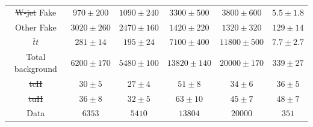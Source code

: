 \documentclass[PAPER, coverpage, atlasdraft=true, texlive=2016, UKenglish]{\ATLASLATEXPATH atlasdoc}
\providecommand{\DIFadd}[1]{{\protect\color{blue}\uwave{#1}}} %
\providecommand{\DIFdel}[1]{{\protect\color{red}\sout{#1}}}                      %
\providecommand{\DIFaddFL}[1]{\DIFadd{#1}} %
\providecommand{\DIFdelFL}[1]{\DIFdel{#1}} %
\providecommand{\DIFaddbeginFL}{} %
\providecommand{\DIFaddendFL}{} %
\providecommand{\DIFdelbeginFL}{} %
\providecommand{\DIFdelendFL}{} %
\begin{document}
\begin{table}[htbp]
\begin{tabular}{cccccc}
  \DIFdelbeginFL \DIFdelFL{W-jet }\DIFdelendFL \DIFaddbeginFL \DIFaddFL{$W$-jet }\DIFaddendFL Fake             & \DIFaddbeginFL \DIFaddFL{~~}\DIFaddendFL $970 \pm 200 $  & $1090 \pm 240$  & $3300 \pm 500$  &  $3800 \pm 600$  & \DIFaddbeginFL \DIFaddFL{~~}\DIFaddendFL $5.5 \pm 1.8  $ \\ 
  Other Fake             & $3020 \pm 260$  & $2470 \pm 160$  & $1420 \pm 220$  &  $1320 \pm 320$  & $129 \pm 14   $ \\ 
  $\bar{t}t$             & $281 \pm 14  $  & $195 \pm 24  $  & $7100 \pm 400$  &  $11800 \pm 500$\DIFaddbeginFL \DIFaddFL{~~ }\DIFaddendFL & \DIFaddbeginFL \DIFaddFL{~~}\DIFaddendFL $7.7 \pm 2.7  $ \\ \midrule
  Total background       & $6200 \pm 170$  & $5480 \pm 100$  & $13820 \pm 140$\DIFaddbeginFL \DIFaddFL{~~ }\DIFaddendFL &  $20000 \pm 170$\DIFaddbeginFL \DIFaddFL{~~ }\DIFaddendFL & $339 \pm 27   $ \\  \midrule
  \DIFdelbeginFL \DIFdelFL{tcH                    }\DIFdelendFL \DIFaddbeginFL \DIFaddFL{$tcH$                    }\DIFaddendFL & $30 \pm 5    $  & $27 \pm 4    $  & $51 \pm 8    $  &  $34 \pm 6    $  & $36 \pm 5     $ \\
  \DIFdelbeginFL \DIFdelFL{tuH                    }\DIFdelendFL \DIFaddbeginFL \DIFaddFL{$tuH$                    }\DIFaddendFL & $36 \pm 8    $  & $32 \pm 5    $  & \DIFaddbeginFL \DIFaddFL{~~}\DIFaddendFL $63 \pm 10   $  &  $45 \pm 7    $  & $48 \pm 7     $ \\ \midrule
  Data                   & $6353        $  & $5410        $  & $13804       $  &  $20000       $  & $351          $ \\ 
\bottomrule\bottomrule
\end{tabular}\\





\end{table}
\end{document}
